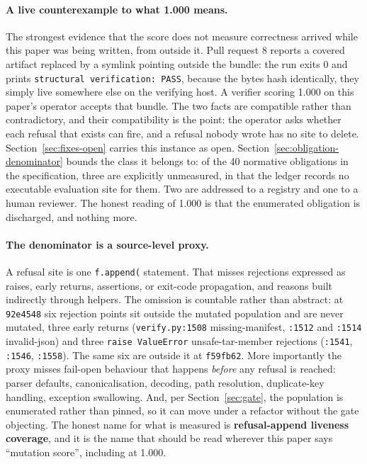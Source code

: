 \documentclass[11pt]{article}
\begin{document}
\paragraph{A live counterexample to what 1.000 means.} The strongest evidence that the score
does not measure correctness arrived while this paper was being written, from outside it. Pull
request 8 reports a covered artifact replaced by a symlink pointing outside the bundle: the run
exits 0 and prints \texttt{structural verification: PASS}, because the bytes hash identically,
they simply live somewhere else on the verifying host. A verifier scoring 1.000 on this paper's
operator accepts that bundle. The two facts are compatible rather than contradictory, and their
compatibility is the point: the operator asks whether each refusal that exists can fire, and a
refusal nobody wrote has no site to delete. Section~\ref{sec:fixes-open} carries this instance
as open. Section~\ref{sec:obligation-denominator} bounds the class it belongs to: of the 40
normative obligations in the specification, three are explicitly unmeasured, in that the ledger
records no executable evaluation site for them. Two are addressed to a registry and one to a
human reviewer. The honest reading of 1.000 is that the enumerated obligation is discharged, and
nothing more.

\paragraph{The denominator is a source-level proxy.} A refusal site is one \texttt{f.append(}
statement. That misses rejections expressed as raises, early returns, assertions, or exit-code
propagation, and reasons built indirectly through helpers. The omission is countable rather
than abstract: at \texttt{92e4548} six rejection points sit outside the mutated population and
are never mutated, three early returns (\texttt{verify.py:1508} missing-manifest,
\texttt{:1512} and \texttt{:1514} invalid-json) and three \texttt{raise ValueError}
unsafe-tar-member rejections (\texttt{:1541}, \texttt{:1546}, \texttt{:1558}). The same six
are outside it at \texttt{f59fb62}. More importantly the proxy misses fail-open behaviour that
happens \emph{before} any refusal is reached: parser defaults, canonicalisation, decoding,
path resolution, duplicate-key handling, exception swallowing. And, per
Section~\ref{sec:gate}, the population is enumerated rather than pinned, so it can move under
a refactor without the gate objecting. The honest name for what is measured is
\textbf{refusal-append liveness coverage}, and it is the name that should be read wherever
this paper says ``mutation score'', including at 1.000.
\end{document}
